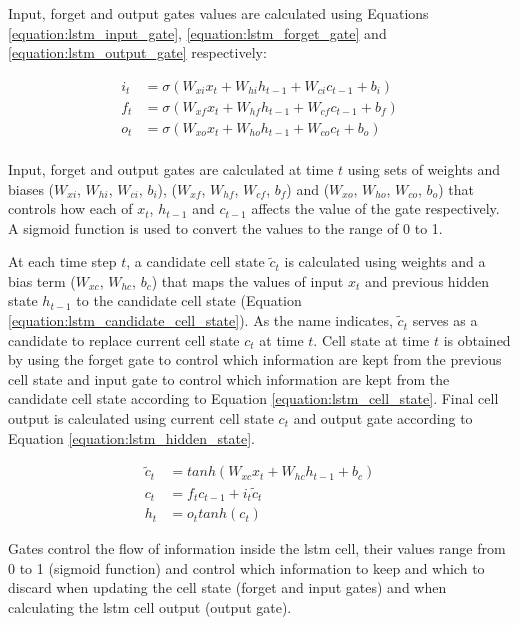 Input, forget and output gates values are calculated using Equations \ref{equation:lstm_input_gate}, \ref{equation:lstm_forget_gate} and \ref{equation:lstm_output_gate} respectively:

\begin{align}
i_t &= \sigma(W_{xi}x_t + W_{hi}h_{t-1}+W_{ci}c_{t-1}+b_i) \label{equation:lstm_input_gate}\\
f_t &= \sigma(W_{xf}x_t + W_{hf}h_{t-1}+W_{cf}c_{t-1}+b_f) \label{equation:lstm_forget_gate}\\
o_t &= \sigma(W_{xo}x_t + W_{ho}h_{t-1}+W_{co}c_t+b_o) \label{equation:lstm_output_gate}\\
\end{align}

Input, forget and output gates are calculated at time $t$ using sets of weights and biases ($W_{xi}$, $W_{hi}$, $W_{ci}$, $b_i$), ($W_{xf}$, $W_{hf}$, $W_{cf}$, $b_f$) and ($W_{xo}$, $W_{ho}$, $W_{co}$, $b_o$) that controls how each of $x_t$, $h_{t-1}$ and $c_{t-1}$ affects the value of the gate respectively. A sigmoid function is used to convert the values to the range of 0 to 1. 

At each time step $t$, a candidate cell state $\tilde{c}_t$ is calculated using weights and a bias term ($W_{xc}$, $W_{hc}$, $b_c$) that maps the values of input $x_t$ and previous hidden state $h_{t-1}$ to the candidate cell state (Equation \ref{equation:lstm_candidate_cell_state}). As the name indicates, $\tilde{c}_t$ serves as a candidate to replace current cell state $c_t$ at time $t$. Cell state at time $t$ is obtained by using the forget gate to control which information are kept from the previous cell state and input gate to control which information are kept from the candidate cell state according to Equation \ref{equation:lstm_cell_state}. Final cell output is calculated using current cell state $c_t$ and output gate according to Equation \ref{equation:lstm_hidden_state}.

\begin{align}
    \tilde{c}_t &= tanh(W_{xc}x_t+W_{hc}h_{t-1}+b_c) \label{equation:lstm_candidate_cell_state} \\
    c_t &= f_tc_{t-1}+i_t\tilde{c}_t \label{equation:lstm_cell_state}\\
    h_t &= o_ttanh(c_t) \label{equation:lstm_hidden_state}
\end{align}

Gates control the flow of information inside the \acrshort{lstm} cell, their values range from 0 to 1 (sigmoid function) and control which information to keep and which to discard when updating the cell state (forget and input gates) and when calculating the \acrshort{lstm} cell output (output gate).

